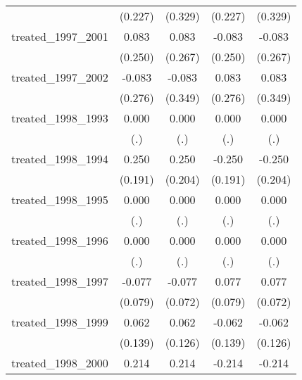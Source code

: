 {\begin{tabular}{l*{4}{c}}
            &     (0.227)         &     (0.329)         &     (0.227)         &     (0.329)         \\
[1em]
treated\_1997\_2001&       0.083         &       0.083         &      -0.083         &      -0.083         \\
            &     (0.250)         &     (0.267)         &     (0.250)         &     (0.267)         \\
[1em]
treated\_1997\_2002&      -0.083         &      -0.083         &       0.083         &       0.083         \\
            &     (0.276)         &     (0.349)         &     (0.276)         &     (0.349)         \\
[1em]
treated\_1998\_1993&       0.000         &       0.000         &       0.000         &       0.000         \\
            &         (.)         &         (.)         &         (.)         &         (.)         \\
[1em]
treated\_1998\_1994&       0.250         &       0.250         &      -0.250         &      -0.250         \\
            &     (0.191)         &     (0.204)         &     (0.191)         &     (0.204)         \\
[1em]
treated\_1998\_1995&       0.000         &       0.000         &       0.000         &       0.000         \\
            &         (.)         &         (.)         &         (.)         &         (.)         \\
[1em]
treated\_1998\_1996&       0.000         &       0.000         &       0.000         &       0.000         \\
            &         (.)         &         (.)         &         (.)         &         (.)         \\
[1em]
treated\_1998\_1997&      -0.077         &      -0.077         &       0.077         &       0.077         \\
            &     (0.079)         &     (0.072)         &     (0.079)         &     (0.072)         \\
[1em]
treated\_1998\_1999&       0.062         &       0.062         &      -0.062         &      -0.062         \\
            &     (0.139)         &     (0.126)         &     (0.139)         &     (0.126)         \\
[1em]
treated\_1998\_2000&       0.214         &       0.214         &      -0.214         &      -0.214         \\

\end{tabular}}
